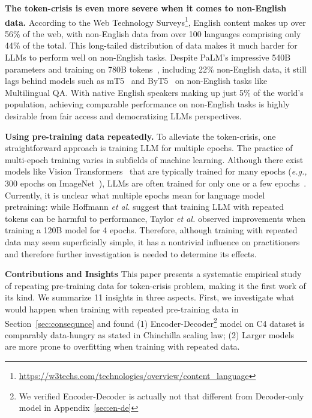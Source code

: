 \documentclass{article}
\newcommand{\eg}{\emph{e.g.,}\xspace}
\def\revise{\textcolor{red}}
\newcommand{\yao}[1]{{\color{cyan} YF: #1}}
\begin{document}
\textbf{The token-crisis is even more severe when it comes to non-English data.} According to the Web Technology Surveys\footnote{\url{https://w3techs.com/technologies/overview/content_language}}, English content makes up over 56\% of the web, with non-English data from over 100 languages comprising only 44\% of the total. This long-tailed distribution of data makes it much harder for LLMs to perform well on non-English tasks. Despite PaLM's impressive 540B parameters and training on 780B tokens~\citep{chowdhery2022palm}, including 22\% non-English data, it still lags behind models such as mT5~\citep{xue2020mt5} and ByT5~\citep{xue2022byt5} on non-English tasks like Multilingual QA. 
With native English speakers making up just 5\% of the world's population, achieving comparable performance on non-English tasks is highly desirable from fair access and democratizing LLMs perspectives.


\textbf{Using pre-training data repeatedly.} To alleviate the token-crisis, one straightforward approach is training LLM for multiple epochs. The practice of multi-epoch training varies in subfields of machine learning.
Although there exist models like Vision Transformers~\citep{dosovitskiy2020image} that are typically trained for many epochs (\eg 300 epochs on ImageNet~\citep{russakovsky2015imagenet}),
 LLMs are often trained for only one or a few epochs~\citep{chowdhery2022palm,hoffmann2022training,touvron2023llama}. 
Currently, it is unclear what multiple epochs mean for language model pretraining:
while Hoffmann \textit{et al.} \cite{hoffmann2022training} suggest that training LLM with repeated tokens can be harmful to performance, Taylor \textit{et al.} \cite{taylor2022galactica} observed improvements when training a 120B model for 4 epochs. 
Therefore, although training with repeated data may seem superficially simple, 
it has a nontrivial influence on practitioners and therefore
further investigation is needed to determine its effects. 

\textbf{Contributions and Insights} This paper presents a systematic empirical study of repeating pre-training data for token-crisis problem, making it the first work of its kind. We summarize 11 insights in three aspects. First, we investigate what would happen when training with repeated pre-training data in Section~\ref{sec:consequnce} and found (1) Encoder-Decoder\footnote{We verified Encoder-Decoder is actually not that different from Decoder-only model in Appendix~\ref{sec:en-de}} model on C4 dataset is comparably data-hungry as stated in Chinchilla scaling law; (2) Larger models are more prone to overfitting when training with repeated data. 
\end{document}
